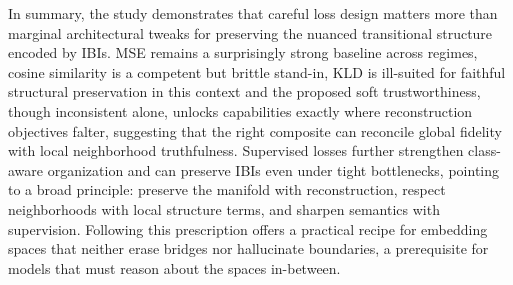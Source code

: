 In summary, the study demonstrates that careful loss design matters more than marginal architectural tweaks for preserving the nuanced transitional structure encoded by IBIs. MSE remains a surprisingly strong baseline across regimes, cosine similarity is a competent but brittle stand-in, KLD is ill-suited for faithful structural preservation in this context and the proposed soft trustworthiness, though inconsistent alone, unlocks capabilities exactly where reconstruction objectives falter, suggesting that the right composite can reconcile global fidelity with local neighborhood truthfulness. Supervised losses further strengthen class-aware organization and can preserve IBIs even under tight bottlenecks, pointing to a broad principle: preserve the manifold with reconstruction, respect neighborhoods with local structure terms, and sharpen semantics with supervision. Following this prescription offers a practical recipe for embedding spaces that neither erase bridges nor hallucinate boundaries, a prerequisite for models that must reason about the spaces in-between.
